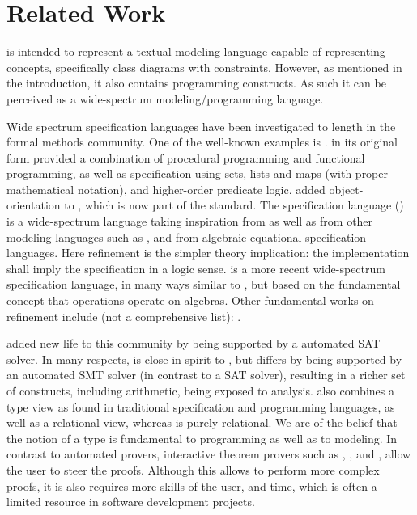 
\section{Related Work}
\label{sec:related-work}

\Klang{} is intended to represent a textual modeling language capable
of representing \sysml{} concepts, specifically class diagrams with
constraints.  However, as mentioned in the introduction, it also
contains programming constructs.  As such it can be perceived as a
wide-spectrum modeling/programming language.

Wide spectrum specification languages have been investigated to length
in the formal methods community. One of the well-known examples
is \vdm{} \cite{vdm78,bjoerner-jones-82,jones90,jones-shaw-90}. \vdm{}
in its original form \cite{vdm78} provided a combination of procedural
programming and functional programming, as well as specification using sets,
lists and maps (with proper mathematical notation), and higher-order
predicate logic. \vdmpp{} \cite{vdmplusplus05} added
object-orientation to \vdm{}, which is now part of the \vdm{}
standard. The \raiselang{} specification language (\rsl{})
\cite{raise92} is a wide-spectrum language taking inspiration from
\vdm{} as well as from other modeling languages such as \zlang{}
\cite{spivey-Z-1988}, and from algebraic equational specification
languages. Here refinement is the simpler theory implication: the implementation
shall imply the specification in a logic sense. \asml{} \cite{asml05} is a 
more recent wide-spectrum specification language, in many ways similar to \vdm{}, 
but based on the fundamental concept that operations operate on algebras. 
Other fundamental works on refinement include (not a comprehensive list): \cite{wirth-refinement-71,hoare-sanders-refinement-86,morgan-refinement-94,woodcock-sanders-z-96,back-wright-refinement-98,abrial-eventb-10}.

\alloy{} \cite{jackson-alloy-12} added new life to this community by being 
supported by a automated SAT solver. In many respects, \Klang{} is close in spirit 
to \alloy{}, but differs by being supported by an automated SMT solver 
(in contrast to a SAT solver), resulting in a richer set of constructs, including arithmetic, being exposed to analysis. \Klang{} also combines a type view as found in traditional specification and programming languages, as well as a relational 
view, whereas \alloy{} is purely relational. We are of the belief that the notion
of a type is fundamental to programming as well as to modeling. In contrast
to automated provers, interactive theorem provers such as
\pvs{} \cite{cade92-pvs,pvs-website}, \coq{} \cite{coq-website}, and 
\isabelle{} \cite{isabelle-website}, allow the user to steer the proofs. 
Although this allows to perform more complex proofs, it is also requires more
skills of the user, and time, which is often a limited resource in software development projects.

